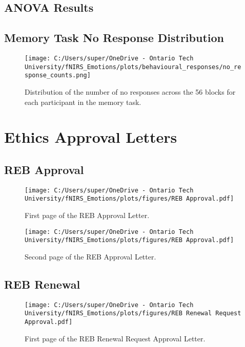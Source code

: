 \section{ANOVA Results}
\label{tab:appendix_memory_task_anova}


\section{Memory Task No Response Distribution}
\begin{figure}[H]
    \centering
    \texttt{[image: C:/Users/super/OneDrive - Ontario Tech University/fNIRS\_Emotions/plots/behavioural\_responses/no\_response\_counts.png]}
    \caption[Memory Task No Response Distribution]{Distribution of the number of no responses across the 56 blocks for each participant in the memory task.}
    \label{fig:appendix_memory_task_no_response_distribution}
\end{figure}

\chapter{Ethics Approval Letters}
\newpage
\section{REB Approval}
\begin{figure}[H]
    \centering
    \texttt{[image: C:/Users/super/OneDrive - Ontario Tech University/fNIRS\_Emotions/plots/figures/REB Approval.pdf]}
    \caption[REB Approval Letter (First Page)]{First page of the REB Approval Letter.}
    \label{fig:appendix_reb_approval_first_page}
\end{figure}

\begin{figure}[H]
    \centering
    \texttt{[image: C:/Users/super/OneDrive - Ontario Tech University/fNIRS\_Emotions/plots/figures/REB Approval.pdf]}
    \caption[REB Approval Letter (Second Page)]{Second page of the REB Approval Letter.}
    \label{fig:appendix_reb_approval_second_page}
\end{figure}

\section{REB Renewal}
\begin{figure}[H]
    \centering
    \texttt{[image: C:/Users/super/OneDrive - Ontario Tech University/fNIRS\_Emotions/plots/figures/REB Renewal Request Approval.pdf]}
    \caption[REB Renewal Request Approval Letter (First Page)]{First page of the REB Renewal Request Approval Letter.}
    \label{fig:appendix_reb_renewal_first_page}
\end{figure}

